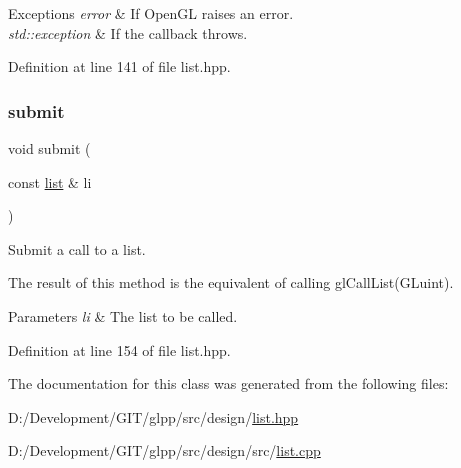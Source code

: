 \begin{DoxyExceptions}{Exceptions}
{\em error} & If Open\+GL raises an error. \\
\hline
{\em std\+::exception} & If the callback throws. \\
\hline
\end{DoxyExceptions}


Definition at line 141 of file list.\+hpp.

\mbox{\label{classglpp_1_1list_acbdbed9fe36925d2ef6f6fe114a32d9d}} 
\subsubsection{\texorpdfstring{submit}{submit}}
{\footnotesize\ttfamily void submit (\begin{DoxyParamCaption}\item[{const \hyperlink{classglpp_1_1list}{list} \&}]{li }\end{DoxyParamCaption})\hspace{0.3cm}{\ttfamily [friend]}}



Submit a call to a list. 

The result of this method is the equivalent of calling gl\+Call\+List(\+G\+Luint).


\begin{DoxyParams}{Parameters}
{\em li} & The list to be called. \\
\hline
\end{DoxyParams}


Definition at line 154 of file list.\+hpp.



The documentation for this class was generated from the following files\+:\begin{DoxyCompactItemize}
\item 
D\+:/\+Development/\+G\+I\+T/glpp/src/design/\hyperlink{list_8hpp}{list.\+hpp}\item 
D\+:/\+Development/\+G\+I\+T/glpp/src/design/src/\hyperlink{list_8cpp}{list.\+cpp}\end{DoxyCompactItemize}
